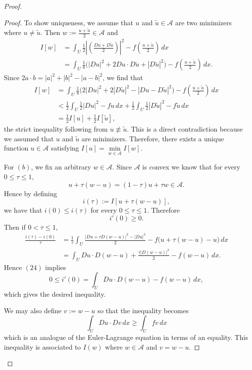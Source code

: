 \documentclass{article}
\begin{document}
\begin{flushleft}
\begin{proof}
\begin{proof}
To show uniqueness, we assume that $u$ and $\tilde{u}\in\mathcal{A}$ are two minimizers where $u\neq \tilde{u}$. Then $w:= \frac{u + \tilde{u}}{2}\in\mathcal{A}$ and
\begin{align*}
I[w] &= \int_U \frac 12 \left|\left(\frac{Du + D\tilde{u}}{2}\right)\right|^2 - f\left(\frac{u+\tilde{u}}{2}\right)\,dx \\&=
\int_U \frac{1}{8}\Big(|Du|^2 + 2Du\cdot D\tilde{u} + |D\tilde{u}|^2\Big) - f\left(\frac{u+\tilde{u}}{2}\right)\,dx.
\end{align*}
Since $2a\cdot b = |a|^2 + |b|^2 - |a-b|^2$, we find that
\begin{align*}
I[w] &=\int_U \frac{1}{8}\Big(2|Du|^2 + 2|D\tilde{u}|^2 - |Du - D\tilde{u}|^2 \Big) - f\left(\frac{u+\tilde{u}}{2}\right)\,dx \\&<
\frac{1}{2}\int_U \frac{1}{2}|Du|^2 - fu\,dx +  \frac{1}{2}\int_U \frac{1}{2}|D\tilde{u}|^2 - f\tilde{u}\,dx \\&=
\frac{1}{2}I[u] + \frac{1}{2}I[\tilde{u}],
\end{align*}
the strict inequality following from $u\not\equiv \tilde{u}$. This is a direct contradiction because we assumed that $u$ and $\tilde{u}$ are minimizers. Therefore, there exists a unique function $u\in\mathcal{A}$ satisfying $I[u]=\underset{w\in\mathcal{A}}{\min} I[w]$.

For $(b)$, we fix an arbitrary $w\in\mathcal{A}$. Since $\mathcal{A}$ is convex we know that for every $0\leq \tau \leq 1$,
$$u+\tau(w-u)=(1-\tau)u+\tau w \in \mathcal{A}.$$
Hence by defining
$$i(\tau):=I[u+\tau(w-u)],$$
we have that $i(0)\leq i(\tau)$ for every $0\leq \tau \leq 1$. Therefore
\begin{equation}
    i'(0)\ge 0.
\end{equation}
Then if $0<\tau \leq 1$,
\begin{align*}\frac{i(\tau)-i(0)}{\tau}&=\frac{1}{\tau}\int_U\frac{|Du+\tau D(w-u)|^2 - |Du|^2}{2}-f\big(u+\tau(w-u)-u\big)\,dx \\&=
\int_U Du\cdot D(w-u)+\frac{\tau |D(w-u)|^2}{2} - f(w-u)\,dx.
\end{align*}
Hence $(24)$ implies
$$0 \le i'(0)= \int_U Du\cdot D(w-u) - f(w-u)\,dx,$$
which gives the desired inequality.

We may also define $v:=w-u$ so that the inequality becomes
$$\int_U Du\cdot Dv\,dx \ge \int_U fv\,dx$$
which is an analogue of the Euler-Lagrange equation in terms of an equality. This inequality is associated to $I(w)$ where $w\in\mathcal{A}$ and $v=w-u$.
\end{proof}


\end{proof}
\end{flushleft}
\end{document}
